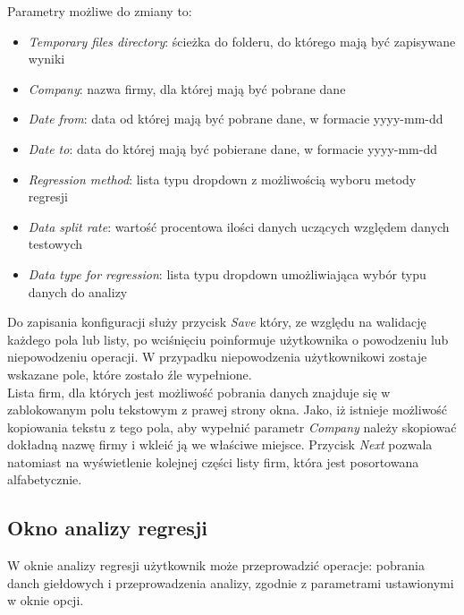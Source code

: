 Parametry możliwe do zmiany to:
\begin{itemize}
 \item \textit{Temporary files directory}: ścieżka do folderu, do którego mają być zapisywane wyniki
 \item \textit{Company}: nazwa firmy, dla której mają być pobrane dane
 \item \textit{Date from}: data od której mają być pobrane dane, w formacie yyyy-mm-dd
 \item \textit{Date to}: data do której mają być pobierane dane, w formacie yyyy-mm-dd
 \item \textit{Regression method}: lista typu dropdown z możliwością wyboru metody regresji
 \item \textit{Data split rate}: wartość procentowa ilości danych uczących względem danych testowych
 \item \textit{Data type for regression}: lista typu dropdown umożliwiająca wybór typu danych do analizy
\end{itemize}

Do zapisania konfiguracji służy przycisk \textit{Save} który, ze względu na walidację każdego pola lub listy, po wciśnięciu poinformuje użytkownika o powodzeniu lub niepowodzeniu operacji.
W przypadku niepowodzenia użytkownikowi zostaje wskazane pole, które zostało źle wypełnione.\\

Lista firm, dla których jest możliwość pobrania danych znajduje się w zablokowanym polu tekstowym z prawej strony okna.
Jako, iż istnieje możliwość kopiowania tekstu z tego pola, aby wypełnić parametr \textit{Company} należy skopiować dokładną nazwę firmy i wkleić ją we właściwe miejsce.
Przycisk \textit{Next} pozwala natomiast na wyświetlenie kolejnej części listy firm, która jest posortowana alfabetycznie.

\subsection{Okno analizy regresji}
W oknie analizy regresji użytkownik może przeprowadzić operacje: pobrania danch giełdowych i przeprowadzenia analizy, zgodnie z parametrami ustawionymi w oknie opcji.

\newpage

